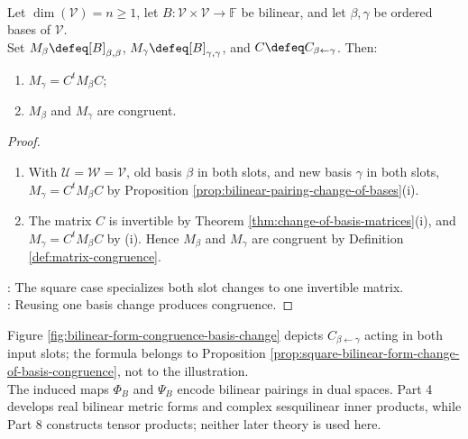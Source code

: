 \begin{proposition} \label{prop:square-bilinear-form-change-of-basis-congruence} \\
Let $\dim(\mathcal{V})=n\geq1$, let $B:\mathcal{V}\times\mathcal{V}\to\mathbb{F}$ be bilinear, and let $\beta,\gamma$ be ordered bases of $\mathcal{V}$.\\
Set $M_{\beta}\defeq[B]_{\beta,\beta}$, $M_{\gamma}\defeq[B]_{\gamma,\gamma}$, and $C\defeq C_{\beta\leftarrow\gamma}$. Then:
\begin{enumerate}[label=(\roman*)]
\setlength{\itemsep}{0pt}
\item $M_{\gamma}=C^tM_{\beta}C$;
\item $M_{\beta}$ and $M_{\gamma}$ are congruent.
\end{enumerate}
\begin{proof}
\begin{enumerate}[label=(\roman*)]
\setlength{\itemsep}{0pt}
\item With $\mathcal{U}=\mathcal{W}=\mathcal{V}$, old basis $\beta$ in both slots, and new basis $\gamma$ in both slots, $M_{\gamma}=C^tM_{\beta}C$ by Proposition \ref{prop:bilinear-pairing-change-of-bases}(i).
\item The matrix $C$ is invertible by Theorem \ref{thm:change-of-basis-matrices}(i), and $M_{\gamma}=C^tM_{\beta}C$ by (i). Hence $M_{\beta}$ and $M_{\gamma}$ are congruent by Definition \ref{def:matrix-congruence}.
\end{enumerate}
: The square case specializes both slot changes to one invertible matrix.\\
: Reusing one basis change produces congruence.
\end{proof}
\end{proposition}

\begin{illustrationfigure}[H]
  \centering
  
  \caption{The same coordinate transition acts in both slots, producing $M_{\gamma}=C_{\beta\leftarrow\gamma}^{\,t}M_{\beta}C_{\beta\leftarrow\gamma}$.}
  \label{fig:bilinear-form-congruence-basis-change}
\end{illustrationfigure}

Figure \ref{fig:bilinear-form-congruence-basis-change} depicts $C_{\beta\leftarrow\gamma}$ acting in both input slots; the formula belongs to Proposition \ref{prop:square-bilinear-form-change-of-basis-congruence}, not to the illustration.\\
The induced maps $\Phi_B$ and $\Psi_B$ encode bilinear pairings in dual spaces. Part 4 develops real bilinear metric forms and complex sesquilinear inner products, while Part 8 constructs tensor products; neither later theory is used here.

